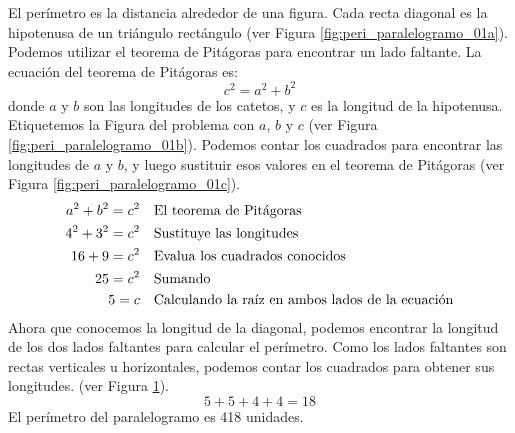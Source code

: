 \begin{solutionbox}{10cm}
\begin{minipage}{0.4\textwidth}
\begin{multicols}{2}
\begin{figure}[H]
                \caption{}
                \label{fig:peri_paralelogramo_01d}
            \end{figure}
        \end{multicols}
    \end{minipage}\hfill
    \begin{minipage}{0.55\textwidth}
        El perímetro es la distancia alrededor de una figura.
        Cada recta diagonal es la hipotenusa de un triángulo rectángulo (ver Figura \ref{fig:peri_paralelogramo_01a}).
        Podemos utilizar el teorema de Pitágoras para encontrar un lado faltante.
        La ecuación del teorema de Pitágoras es:
        \[c^2=a^2+b^2\]
        donde $a$ y $b$ son las longitudes de los catetos, y $c$ es la longitud de la hipotenusa.
        Etiquetemos la Figura del problema con $a$, $b$ y $c$ (ver Figura \ref{fig:peri_paralelogramo_01b}).
        Podemos contar los cuadrados para encontrar las longitudes de $a$ y $b$, y luego sustituir esos valores en el teorema de Pitágoras (ver Figura \ref{fig:peri_paralelogramo_01c}).
        \begin{align*}
            a^2+b^2  =c^2 & \text{\quad El teorema de Pitágoras}                          \\
            4^2+3^2  =c^2 & \text{\quad Sustituye las longitudes}                         \\
            16 +9 =c^2    & \text{\quad Evalua los cuadrados conocidos}                   \\
            25=c^2        & \text{\quad Sumando }                                         \\
            5=c           & \text{\quad Calculando la raíz en ambos lados de la ecuación} \\
        \end{align*}
        Ahora que conocemos la longitud de la diagonal, podemos encontrar la longitud de los dos lados faltantes para calcular el perímetro.
        Como los lados faltantes son rectas verticales u horizontales, podemos contar los cuadrados para obtener sus longitudes. (ver Figura \ref{fig:peri_paralelogramo_01d}).
        \[5+5+4+4=18\]
        El perímetro del paralelogramo es 418 unidades.
    \end{minipage}
\end{solutionbox}
